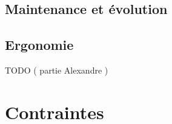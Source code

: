 \subsection*{Maintenance et évolution}

\subsection*{Ergonomie}
TODO ( partie Alexandre )

\section {Contraintes}
